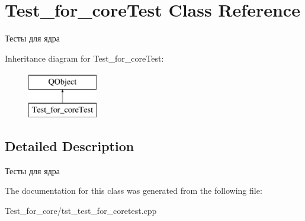 \hypertarget{class_test__for__core_test}{}\section{Test\+\_\+for\+\_\+core\+Test Class Reference}
\label{class_test__for__core_test}


Тесты для ядра  


Inheritance diagram for Test\+\_\+for\+\_\+core\+Test\+:\begin{figure}[H]
\begin{center}
\leavevmode
\includegraphics[height=2.000000cm]{class_test__for__core_test}
\end{center}
\end{figure}


\subsection{Detailed Description}
Тесты для ядра 

The documentation for this class was generated from the following file\+:\begin{DoxyCompactItemize}
\item 
Test\+\_\+for\+\_\+core/tst\+\_\+test\+\_\+for\+\_\+coretest.\+cpp\end{DoxyCompactItemize}
